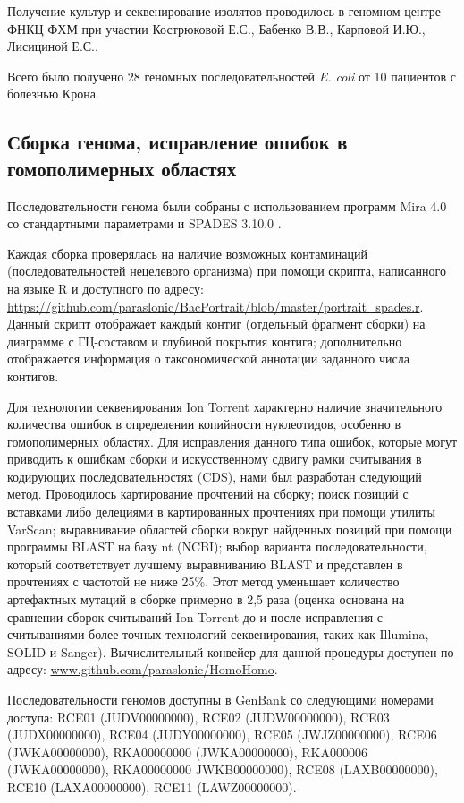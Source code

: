 Получение культур и секвенирование изолятов  проводилось в геномном центре ФНКЦ ФХМ при участии Кострюковой Е.С., Бабенко В.В., Карповой И.Ю., Лисициной Е.С..

Всего было получено 28 геномных последовательностей \textit{E. coli} от 10 пациентов с болезнью Крона.

\subsection{Сборка генома, исправление ошибок в гомополимерных областях}
Последовательности генома были собраны с использованием программ Mira 4.0 \cite{chevreux1999genome} со стандартными параметрами и SPADES 3.10.0 \cite{bankevich2012spades}.

Каждая сборка проверялась на наличие возможных контаминаций (последовательностей нецелевого организма) при помощи скрипта, написанного на языке R и доступного по адресу: \url{https://github.com/paraslonic/BacPortrait/blob/master/portrait\_spades.r}. Данный скрипт отображает каждый контиг (отдельный фрагмент сборки) на диаграмме с ГЦ-составом и глубиной покрытия контига; дополнительно отображается информация о таксономической аннотации заданного числа контигов. 
 
Для технологии секвенирования Ion Torrent характерно наличие значительного количества ошибок в определении копийности нуклеотидов, особенно в гомополимерных областях. Для исправления данного типа ошибок, которые могут приводить к ошибкам сборки и искусственному сдвигу рамки считывания в кодирующих последовательностях (CDS), нами был разработан следующий метод. Проводилось картирование прочтений на сборку; поиск позиций с вставками либо делециями в картированных прочтениях при помощи утилиты VarScan; выравнивание областей сборки вокруг найденных позиций при помощи программы BLAST на базу nt (NCBI); выбор варианта последовательности, который соответствует лучшему выравниванию BLAST и представлен в прочтениях с частотой не ниже 25\%. Этот метод уменьшает количество артефактных мутаций в сборке примерно в 2,5 раза (оценка основана на сравнении сборок считываний Ion Torrent до и после исправления с считываниями более точных технологий секвенирования, таких как Illumina, SOLID и Sanger). Вычислительный конвейер для данной процедуры доступен по адресу: \url{www.github.com/paraslonic/HomoHomo}.

Последовательности геномов доступны в GenBank со следующими номерами доступа: RCE01 (JUDV00000000), RCE02 (JUDW00000000), RCE03 (JUDX00000000), RCE04 (JUDY00000000), RCE05 (JWJZ00000000), RCE06 (JWKA00000000), RKA00000000 (JWKA00000000), RKA000006 (JWKA00000000), RKA00000000 JWKB00000000), RCE08 (LAXB00000000), RCE10 (LAXA00000000), RCE11 (LAWZ00000000).

